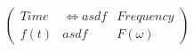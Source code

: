 \documentclass[preview]{standalone}
\begin{document}
\begin{align*}
\left( \begin{array}{cl} Time & \Longleftrightarrow asdf & Frequency \\ f(t) & asdf & F(\omega) \end{array} \right)
\end{align*}
\end{document}
